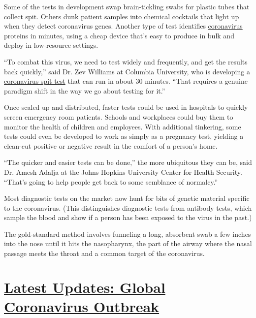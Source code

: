 Some of the tests in development swap brain-tickling swabs for plastic
tubes that collect spit. Others dunk patient samples into chemical
cocktails that light up when they detect coronavirus genes. Another type
of test identifies
\href{https://www.nytimes.com/2020/07/15/parenting/kids-covid-19-test.html}{coronavirus}
proteins in minutes, using a cheap device that's easy to produce in bulk
and deploy in low-resource settings.

``To combat this virus, we need to test widely and frequently, and get
the results back quickly,'' said Dr. Zev Williams at Columbia
University, who is developing a
\href{https://www.medrxiv.org/content/10.1101/2020.06.13.20129841v1.full.pdf}{coronavirus
spit test} that can run in about 30 minutes. ``That requires a genuine
paradigm shift in the way we go about testing for it.''

Once scaled up and distributed, faster tests could be used in hospitals
to quickly screen emergency room patients. Schools and workplaces could
buy them to monitor the health of children and employees. With
additional tinkering, some tests could even be developed to work as
simply as a pregnancy test, yielding a clean-cut positive or negative
result in the comfort of a person's home.

``The quicker and easier tests can be done,'' the more ubiquitous they
can be, said Dr. Amesh Adalja at the Johns Hopkins University Center for
Health Security. ``That's going to help people get back to some
semblance of normalcy.''

Most diagnostic tests on the market now hunt for bits of genetic
material specific to the coronavirus. (This distinguishes diagnostic
tests from antibody tests, which sample the blood and show if a person
has been exposed to the virus in the past.)

The gold-standard method involves funneling a long, absorbent swab a few
inches into the nose until it hits the nasopharynx, the part of the
airway where the nasal passage meets the throat and a common target of
the coronavirus.

\hypertarget{latest-updates-global-coronavirus-outbreak}{%
\section{\texorpdfstring{\href{https://www.nytimes.com/2020/08/04/world/coronavirus-cases.html?action=click\&pgtype=Article\&state=default\&region=MAIN_CONTENT_1\&context=storylines_live_updates}{Latest
Updates: Global Coronavirus
Outbreak}}{Latest Updates: Global Coronavirus Outbreak}}\label{latest-updates-global-coronavirus-outbreak}}

